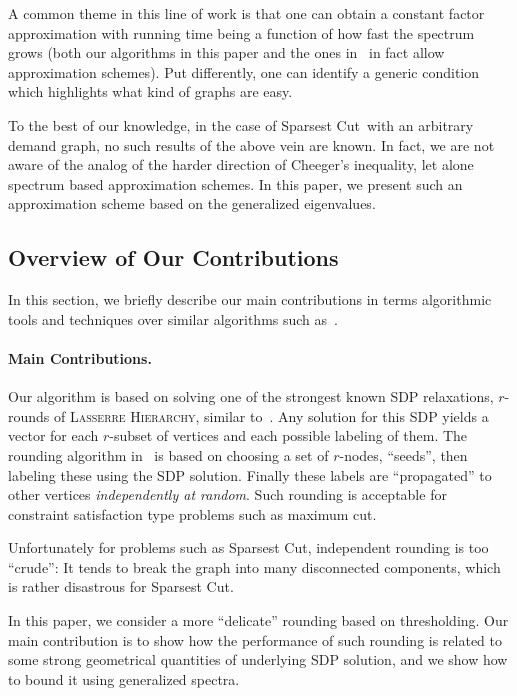 \documentclass{article}
\newcommand{\nusc}{\textsc{\sf Non-Uniform Sparsest Cut}}
\newcommand{\lh}{\textsc{\sf Lasserre Hierarchy}}
\newcounter{alg-count}
\def\ngap{}
\renewcommand{\nusc}{{\sc Sparsest Cut}}
\begin{document}
A common theme in this line of work is that one can obtain a constant
factor approximation with running time being a function of how fast
the spectrum grows (both our algorithms in this paper and the ones
in~\cite{gs11-qip} in fact allow approximation schemes).  Put
differently, one can identify a generic condition which highlights
what kind of graphs are easy.

To the best of our knowledge, in the case of \nusc\ with an arbitrary
demand graph, no such results of the above vein are known.  In fact,
we are not aware of the analog of the harder direction of Cheeger's
inequality, let alone spectrum based approximation schemes. In this
paper, we present such an approximation scheme based on the
generalized eigenvalues. \ngap
\subsection{Overview of Our Contributions}
\label{sec:our-cont} \label{sec:intro-rse}
In this section, we briefly describe our main contributions in terms
algorithmic tools and techniques over similar algorithms such
as~\cite{gs11-qip}.

\medskip
\paragraph{Main Contributions.}
Our algorithm is based on solving one of the strongest known SDP
relaxations, $r$-rounds of \lh, similar to~\cite{gs11-qip}.  Any
solution for this SDP yields a vector for each $r$-subset of vertices
and each possible labeling of them.  The rounding algorithm
in~\cite{gs11-qip} is based on choosing a set of $r$-nodes, ``seeds'',
then labeling these using the SDP solution. Finally these labels are
``propagated'' to other vertices {\em independently at random}.  Such
rounding is acceptable for constraint satisfaction type problems such
as maximum cut.

Unfortunately for problems such as \nusc, independent rounding is too
``crude'': It tends to break the graph into many disconnected
components, which is rather disastrous for \nusc.

In this paper, we consider a more ``delicate'' rounding based on
thresholding.  Our main contribution is to show how the performance of
such rounding is related to some strong geometrical quantities of
underlying SDP solution, and we show how to bound it using generalized
spectra.

\medskip
\end{document}
